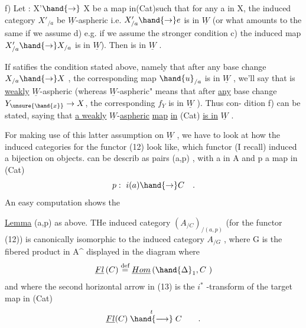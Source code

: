 
f) Let : X'$\hand{\to}$ X be a map in(Cat)such that for any a in X, the
induced category $X'_{/a}$ be $\underline{W}$-aspheric i.e. $X'_{/a}\hand{\to} e$ is in $\underline{W}$
(or what amounts to the same if we assume d) e.g. if we assume
the stronger condition c)\hand{,} the induced map $X'_{/a}\hand{\to} X_{/a}$ is in $\underline{W}$).
Then  is in $\underline{W}$ .

If  satifies the condition stated above, namely that after any base
change $X_{/a}\hand{\to} X$ , the corresponding map $\hand{u}_{/a}$ is in $\underline{W}$ , we'll say that 
is \uline{weakly} $\underline{W}$-aspheric (whereas  $\underline{W}$-aspheric" means that after \uline{any}
base change $Y_{\unsure{\hand{x}}}\to X$, the corresponding  $f_Y$ is in $\underline{W}$ ). Thus con-%
dition f) can be stated, saying that \uline{a weakly} $\underline{W}$-\uline{aspheric} \uline{map} \uline{in} (Cat)
\uline{is in} $\underline{W}$ .

For  making use of this latter assumption on $\underline{W}$ , we have to
look at how the induced categories for the functor (12) look like, which
functor (I recall) induced a bijection on objects.  can be describ
as pairs (a,p) , with a in A and p a map in (Cat)
\[ p:\ i(a)\hand{\to} C \quad . \]
An easy computation shows the

\uline{Lemma}  (a,p) as above. THe induced category $({A}_{/C})_{/(a,p)}$ (for
the functor (12)) is canonically isomorphic to the induced category
$A_{/G}$ , where G is the fibered product in A\^{} displayed in the diagram
where
\[ \underline{Fl}\,(C) \overset{\text{def}}{=} \underline{Hom}\,(\hand{\Delta}_1,C\ ) \]
and where the second horizontal arrow in (13) is the $i^{*}$ -transform of the
target map in (Cat)
\[ \underline{Fl}(C) \mathrel{\overset{\ t\ }{\hand{\longrightarrow}}} C \qquad . \]

